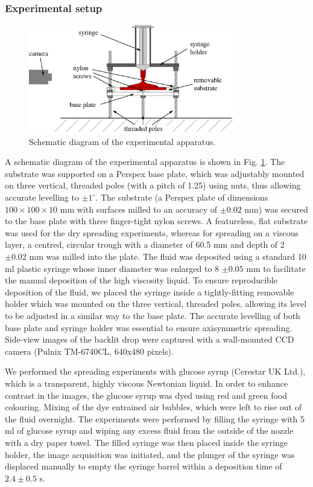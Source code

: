 \documentclass[aip,graphicx]{revtex4-1}
\begin{document}
\subsubsection{Experimental setup}
\label{sec:experimental_setup}

\begin{figure}[!h]
\centering
\includegraphics[width=0.8\textwidth]{figures/experimental_apparatus_nobox.eps}
\caption{Schematic diagram of the experimental apparatus.}
\label{fig:experimental_apparatus}
\end{figure}

A schematic diagram of the experimental apparatus is
shown in Fig. \ref{fig:experimental_apparatus}. The substrate was
supported on a Perspex base plate, which was adjustably mounted on
three vertical, threaded poles (with a pitch of 1.25) using nuts, thus allowing accurate
levelling to $\pm 1^\circ$. The substrate (a Perspex plate of
dimensions $100 \times 100 \times 10$ mm with surfaces milled to an
accuracy of $\pm 0.02$ mm)
was secured to the base plate with three finger-tight nylon screws. A
featureless, flat substrate was used for the dry spreading
experiments, whereas for spreading on a viscous layer, a centred,
circular trough with a diameter of 60.5 mm and depth of 2 $\pm 0.02$ mm was milled into the plate. The fluid was deposited using a
standard 10 ml plastic syringe whose inner diameter was enlarged 
to 8 $\pm 0.05$ mm to facilitate the manual deposition of the high
viscosity liquid. To ensure reproducible deposition of the
fluid, we placed the syringe inside a tightly-fitting removable
holder which was mounted on the three vertical, threaded poles, 
allowing its level to be adjusted in a similar way to the base plate. The
accurate levelling of both base plate and syringe holder was essential
to ensure axisymmetric spreading. 
Side-view images of the backlit drop were captured with a wall-mounted 
CCD camera (Pulnix TM-6740CL, 640x480 pixels). 

We performed the spreading experiments with glucose syrup 
(Cerestar UK Ltd.), which is a transparent, highly viscous Newtonian
liquid. In order to enhance contrast in the images, the glucose syrup
was dyed using red and green food colouring.  Mixing of the dye
entrained air bubbles, which were left to rise out of the fluid
overnight. The experiments were performed by filling the syringe with
5 ml of glucose syrup and wiping any excess fluid from the outside of
the nozzle with a dry paper towel. The filled syringe was then placed
inside the syringe holder, the image acquisition was initiated, and
the plunger of the syringe was displaced manually to empty the
syringe barrel within a deposition time of $2.4 \pm 0.5$ s.
\end{document}
